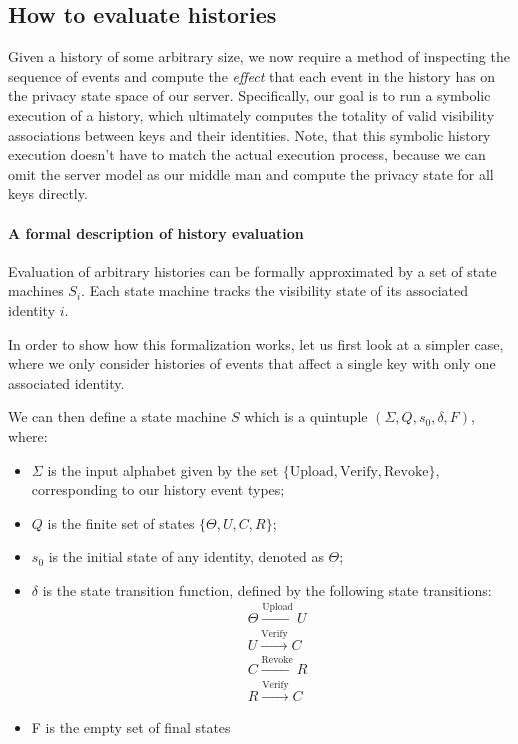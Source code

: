 \subsection{How to evaluate histories}
Given a history of some arbitrary size, we now require a method of inspecting the sequence of events and compute the \emph{effect} that each event in the history has on the privacy state space of our server. 
Specifically, our goal is to run a symbolic execution of a history, which ultimately computes the totality of valid visibility associations between keys and their identities. Note, that this symbolic history execution doesn't have to match the actual execution process, because we can omit the server model as our middle man and compute the privacy state for all keys directly.

\paragraph{A formal description of history evaluation}
\label{sec:history_def}

Evaluation of arbitrary histories can be formally approximated by a set of state machines \(S_i\). Each state machine tracks the visibility state of its associated identity \(i\).

In order to show how this formalization works, let us first look at a simpler case, where we only consider histories of events that affect a single key with only one associated identity. 

We can then define a state machine \(S\) which is a quintuple \((\Sigma,Q,s_0,\delta,F)\), where:
\begin{itemize}
    \item \(\Sigma\) is the input alphabet given by the set \(\{\text{Upload},\text{Verify},\text{Revoke}\}\), corresponding to our history event types;
    \item \(Q\) is the finite set of states \(\{\Theta,U,C,R\}\);
    \item \(s_0\) is the initial state of any identity, denoted as \(\Theta\);
    \item \(\delta\) is the state transition function, defined by the following state transitions:
    \begin{equation}
        \begin{aligned}
            &\Theta \xrightarrow{\text{Upload}}U \\
            &U \xrightarrow{\text{Verify}}C \\
            &C \xrightarrow{\text{Revoke}}R \\
            &R \xrightarrow{\text{Verify}}C
        \end{aligned}
    \end{equation}
    \item F is the empty set of final states
\end{itemize}

